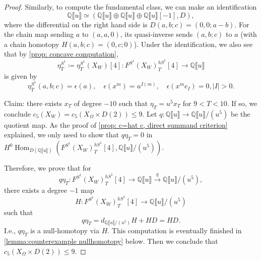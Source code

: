 \documentclass[11pt]{amsart}
\numberwithin{equation}{section}
\theoremstyle{plain}
\theoremstyle{definition}
\theoremstyle{remark}
\newcommand{\bQ} { {\mathbb{Q}}}
\newcommand{\fpw}[1]{{\llbracket #1\rrbracket}}
\newcommand\Hom{\operatorname{Hom}}
\begin{document}
\begin{proof}
Similarly, to compute the fundamental class, we can make an identification
\[\bQ\fpw{u} \simeq (\bQ\fpw{u} \oplus \bQ\fpw{u} \oplus \bQ\fpw{u}[-1], D),\]
where the differential on the right hand side is $D(a, b; c) = (0, 0; a-b)$. For the chain map sending $a$ to $(a, a, 0)$, its quasi-inverse sends $(a, b; c)$ to $a$ (with a chain homotopy $H(a, b; c) = (0, c; 0)$). 
Under the identification, we also see that by \autoref{prop: concave computation},
\[\eta_T^{S^1}\coloneqq \eta_T^{S^1}(X_{W})[4]: F^{S^1}(X_W)_T^{hS^1}[4] \to \bQ\fpw{u}\]
is given by
\[\eta_T^{S^1}(a,b;c)=\epsilon(a),\quad \epsilon(x^m)=u^{I(m)},\quad \epsilon(x^m e_{I})=0, |I|>0.\]

Claim: there exists $x_T$ of degree $-10$ such that $\eta_T=u^5x_T$ for $9<T<10$. If so, we conclude $c_5(X_W)=c_5(X_\Omega\times D(2)) \leq 9$. Let $q:\bQ\fpw{u}  \to \bQ\fpw{u}/(u^5)$ be the quotient map. As the proof of \autoref{prop: c=hat c, direct summand criterion} explained, we only need to show that 
$q\eta_T=0$ in  $H^0\Hom_{D(\bQ\fpw{u})}(F^{S^1}(X_W)_T^{hS^1}[4],\bQ\fpw{u}/(u^5))$.

Therefore, we prove that for
\[q\eta_T: F^{S^1}(X_W)_T^{hS^1}[4] \to \bQ\fpw{u} \xrightarrow{q} \bQ\fpw{u}/(u^5),\]
there exists a degree $-1$ map
\[H: F^{S^1}(X_W)_T^{hS^1}[4] \to \bQ\fpw{u}/(u^5)\]
such that
\[q\eta_T=d_{\bQ\fpw{u}/(u^5)}H+HD=HD.\]
I.e., $q\eta_T$ is a null-homotopy via $H$. This computation is eventually finished in \autoref{lemma:counterexample nullhomotopy} below. Then we conclude that $c_5(X_\Omega \times D(2))\leq 9$.
\end{proof}
\end{document}
